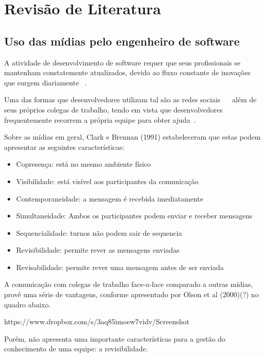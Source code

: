 \chapter{Revisão de Literatura}

\section{Uso das mídias pelo engenheiro de software}

A atividade de desenvolvimento de software requer que seus profissionais se mantenham constatemente atualizados, devido ao fluxo constante de inovações que surgem diariamente ~\cite{Singer2014}.

Uma das formas que desenvolvedores utilizam tal são as redes sociais ~\cite{Treude2012}~\cite{Storey2014} além de seus próprios colegas de trabalho, tendo em vista que desenvolvedores frequentemente recorrem a própria equipe para obter ajuda~\cite{Weinberg1998}.


Sobre as mídias em geral, Clark e Brennan (1991) estabeleceram que estas podem apresentar as seguintes características:

\begin{itemize}
  \item Copresença: está no mesmo ambiente físico
  \item Visibilidade: está visível aos participantes da comunicação
  \item Contemporaneidade: a mensagem é recebida imediatamente
  \item Simultaneidade: Ambos os participantes podem enviar e receber mensagens
  \item Sequencialidade: turnos não podem sair de sequencia
  \item Revisibilidade: permite rever as mensagens enviadas
  \item Revisabilidade: permite rever uma mensagem antes de ser enviada
\end{itemize}

A comunicação com colegas de trabalho face-a-face comparado a outras mídias, provê uma série de vantagens, conforme apresentado por Olson et al (2000)(?) no quadro abaixo.

https://www.dropbox.com/s/3aq85imoew7vidv/Screenshot%

Porém, não apresenta uma importante características para a gestão do conhecimento de uma equipe: a revisibilidade.

